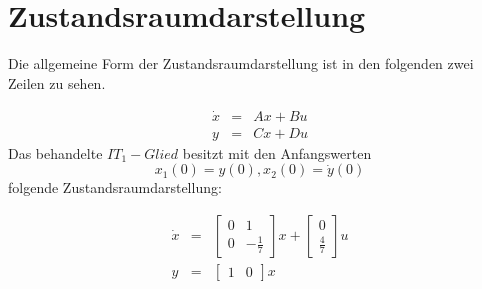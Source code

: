 \section{Zustandsraumdarstellung}

Die allgemeine Form der Zustandsraumdarstellung ist in den folgenden zwei Zeilen zu sehen.

\begin{eqnarray*}
	\dot x &=& Ax + Bu \\
	y &=& Cx + Du
\end{eqnarray*}
\noindent
Das behandelte $IT_1-Glied$ besitzt mit den Anfangswerten \[x_1(0) = y(0),  x_2(0) = \dot y(0)\] folgende Zustandsraumdarstellung:

\begin{eqnarray*}
	\dot x &=& \left[\begin{array}{cc} 0 & 1\\ 0 & -\frac{1}{7}\end{array}\right] x + \left[\begin{array}{c} 0\\ \frac{4}{7}\end{array}\right] u \\
	y &=& \left[\begin{array}{cc} 1 & 0\end{array}\right] x
\end{eqnarray*} 
